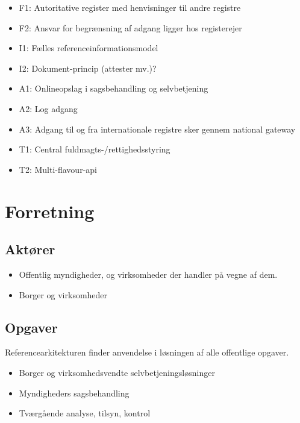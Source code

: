 \begin{itemize}
\tightlist
\item
  F1: Autoritative register med henvisninger til andre registre
\item
  F2: Ansvar for begrænsning af adgang ligger hos registerejer
\item
  I1: Fælles referenceinformationsmodel
\item
  I2: Dokument-princip (attester mv.)?
\item
  A1: Onlineopslag i sagsbehandling og selvbetjening
\item
  A2: Log adgang
\item
  A3: Adgang til og fra internationale registre sker gennem national
  gateway
\item
  T1: Central fuldmagts-/rettighedsstyring
\item
  T2: Multi-flavour-api
\end{itemize}

\section{Forretning}\label{forretning}

\subsection{Aktører}\label{aktuxf8rer}

\begin{itemize}
\tightlist
\item
  Offentlig myndigheder, og virksomheder der handler på vegne af dem.
\item
  Borger og virksomheder
\end{itemize}

\subsection{Opgaver}\label{opgaver}

Referencearkitekturen finder anvendelse i løsningen af alle offentlige
opgaver.

\begin{itemize}
\tightlist
\item
  Borger og virksomhedsvendte selvbetjeningsløsninger
\item
  Myndigheders sagsbehandling
\item
  Tværgående analyse, tilsyn, kontrol
\end{itemize}

